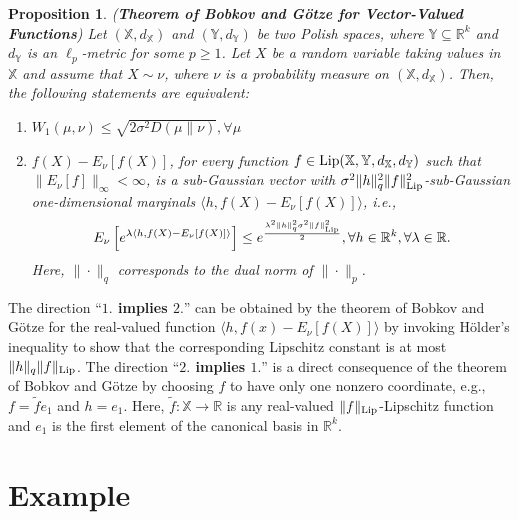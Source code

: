 \documentclass[twoside,11pt]{article}
\newtheorem{prop}{Proposition}
\begin{document}
 \begin{prop}\label{prop:Bobkov-Gotze_extension}
(\textbf{Theorem of Bobkov and G\"{o}tze for Vector-Valued Functions})
Let $(\mathbb{X},d_{\mathbb{X}})$ and $(\mathbb{Y},d_{\mathbb{Y}})$ be two  Polish spaces, where $\mathbb{Y}\subseteq \mathbb{R}^k$ and $d_{\mathbb{Y}}$ is an $\ell_p$-metric for some $p\geq 1$. Let $X$  be a random variable taking values in $\mathbb{X}$ and assume that $X\sim \nu$, where $\nu$ is a  probability measure on $(\mathbb{X},d_{\mathbb{X}})$. Then, the following statements are equivalent:
\begin{enumerate}
\item $W_{1}(\mu,\nu)\leq \sqrt{2\sigma^2 D(\mu\|\nu)}, \forall \mu$ 
\item $f(X)-E_{\nu}[f(X)]$, for every function $f\in {\rm Lip}(\mathbb{X},\mathbb{Y},d_{\mathbb{X}},d_{\mathbb{Y}})$ such that $\|E_{\nu}[f]\|_\infty<\infty$, is a sub-Gaussian vector with $\sigma^2\|h\|_q^2\|f\|_{\rm Lip}^2$-sub-Gaussian one-dimensional marginals $\langle h,f(X)-E_{\nu}[f(X)]\rangle$, i.e., 
 \begin{equation}\label{eq:Bobkov_Gotze_extension_1}
E_{\nu}\left[e^{\lambda \langle h,f(X)-E_{\nu}[f(X)]\rangle}\right]\leq e^{\frac{\lambda^2 \|h\|_q^2 \sigma^2 \|f\|_{\rm Lip}^2}{2}}, \forall h\in \mathbb{R}^{k}, \forall \lambda\in \mathbb{R}.
\end{equation}
 Here, $\|\cdot\|_q$ corresponds to the dual norm of $\|\cdot\|_p$. 
 \end{enumerate}
\end{prop}  
The direction ``\textbf{$1.$ implies $2.$}'' can be obtained by the theorem of Bobkov and G\"{o}tze for the real-valued function $\langle h, f(x)-E_{\nu}[f(X)]\rangle$ by invoking H\"{o}lder's inequality to show that the corresponding Lipschitz constant is at most $\|h\|_q \|f\|_{\rm Lip}$. The direction ``\textbf{$2.$ implies $1.$}'' is a direct consequence of the theorem of Bobkov and G\"{o}tze by choosing $f$ to have only one nonzero coordinate, e.g., $f=\tilde{f}e_1$ and $h=e_1$. Here, $\tilde{f}:\mathbb{X}\rightarrow \mathbb{R}$ is any real-valued $\|f\|_{\rm Lip}$-Lipschitz function and $e_1$ is the first element of the canonical basis in $\mathbb{R}^k$.
 
 
 
 
 
\section{Example}
\end{document}
